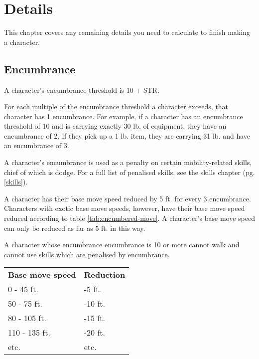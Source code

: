 \chapter{Details}

\begin{multicols*}{2}
    This chapter covers any remaining details you need to calculate to finish
    making a character.

    \section{Encumbrance}
    A character's encumbrance threshold is 10 + STR.

    For each multiple of the encumbrance threshold a character exceeds, that
    character has 1 encumbrance. For example, if a character has an encumbrance
    threshold of 10 and is carrying exactly 30 lb. of equipment, they have an
    encumbrance of 2. If they pick up a 1 lb. item, they are carrying 31 lb. and
    have an encumbrance of 3.

    A character's encumbrance is used as a penalty on certain mobility-related
    skills, chief of which is dodge. For a full list of penalised skills, see the
    skills chapter (pg. \ref{skills}).

    A character has their base move speed reduced by 5 ft. for every 3
    encumbrance. Characters with exotic base move speeds, however, have their
    base move speed reduced according to table \ref{tab:encumbered-move}.
    A character's base move speed can only be reduced as far as 5 ft. in this
    way.

    A character whose encumbrance encumbrance is 10 or more cannot walk
    and cannot use skills which are penalised by encumbrance.

    \begin{center}
        \unclassedrowcolors
        \begin{tabularx}{0.5\textwidth}{X l}
            \textbf{Base move speed} & \textbf{Reduction} \\
            0 - 45 ft. & -5 ft. \\
            50 - 75 ft. & -10 ft. \\
            80 - 105 ft. & -15 ft. \\
            110 - 135 ft. & -20 ft. \\
            etc. & etc. \\
        \end{tabularx}
        \label{tab:encumbered-move}
    \end{center}
\end{multicols*}
